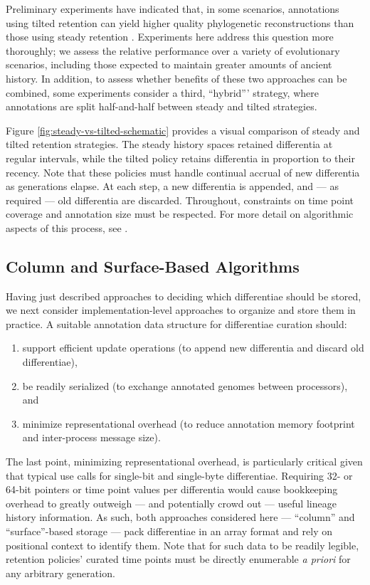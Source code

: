 Preliminary experiments have indicated that, in some scenarios, annotations using tilted retention can yield higher quality phylogenetic reconstructions than those using steady retention \citep{moreno2022hereditary}.
Experiments here address this question more thoroughly; we assess the relative performance over a variety of evolutionary scenarios, including those expected to maintain greater amounts of ancient history.
In addition, to assess whether benefits of these two approaches can be combined, some experiments consider a third, ``hybrid''' strategy, where annotations are split half-and-half between steady and tilted strategies.

Figure \ref{fig:steady-vs-tilted-schematic} provides a visual comparison of steady and tilted retention strategies.
The steady history spaces retained differentia at regular intervals, while the tilted policy retains differentia in proportion to their recency.
Note that these policies must handle continual accrual of new differentia as generations elapse.
At each step, a new differentia is appended, and --- as required --- old differentia are discarded.
Throughout, constraints on time point coverage and annotation size must be respected.
For more detail on algorithmic aspects of this process, see \citet{moreno2024algorithms,moreno2024structured}.

\subsection{Column and Surface-Based Algorithms}
\label{sec:methods-column-vs-surface-algorithms}

Having just described approaches to deciding which differentiae should be stored, we next consider implementation-level approaches to organize and store them in practice.
A suitable annotation data structure for differentiae curation should:
\begin{enumerate}
\item support efficient update operations (to append new differentia and discard old differentiae),
\item be readily serialized (to exchange annotated genomes between processors), and
\item minimize representational overhead (to reduce annotation memory footprint and inter-process message size).
\end{enumerate}

The last point, minimizing representational overhead, is particularly critical given that typical use calls for single-bit and single-byte differentiae.
Requiring 32- or 64-bit pointers or time point values per differentia would cause bookkeeping overhead to greatly outweigh --- and potentially crowd out --- useful lineage history information.
As such, both approaches considered here --- ``column'' and ``surface''-based storage --- pack differentiae in an array format and rely on positional context to identify them.
Note that for such data to be readily legible, retention policies' curated time points must be directly enumerable \textit{a priori} for any arbitrary generation.

